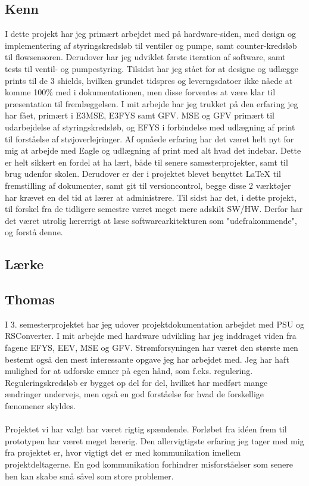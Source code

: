 \subsection{Kenn}
I dette projekt har jeg primært arbejdet med på hardware-siden, med design og implementering af styringskredsløb til ventiler og pumpe, samt counter-kredsløb til flowsensoren. Derudover har jeg udviklet første iteration af software, samt tests til ventil- og pumpestyring. Tilsidst har jeg stået for at designe og udlægge prints til de 3 shields, hvilken grundet tidspres og leverngsdatoer ikke nåede at komme 100\% med i dokumentationen, men disse forventes at være klar til præsentation til fremlæggelsen. I mit arbejde har jeg trukket på den erfaring jeg har fået, primært i E3MSE, E3FYS samt GFV. MSE og GFV primært til udarbejdelse af styringskredsløb, og EFYS i forbindelse med udlægning af print til forståelse af støjoverlejringer.\newline
Af opnåede erfaring har det været helt nyt for mig at arbejde med Eagle og udlægning af print med alt hvad det indebar. Dette er helt sikkert en fordel at ha lært, både til senere samesterprojekter, samt til brug udenfor skolen. Derudover er der i projektet blevet benyttet LaTeX til fremstilling af dokumenter, samt git til versioncontrol, begge disse 2 værktøjer har krævet en del tid at lærer at administrere. Til sidst har det, i dette projekt, til forskel fra de tidligere semestre været meget mere adskilt SW/HW. Derfor har det været utrolig lærerrigt at læse softwarearkitekturen som "udefrakommende", og forstå denne.

\subsection{Lærke}

\subsection{Thomas}
I 3. semesterprojektet har jeg udover projektdokumentation arbejdet med PSU og RSConverter. I mit arbejde med hardware udvikling har jeg inddraget viden fra fagene EFYS, EEV, MSE og GFV. Strømforsyningen har været den største men bestemt også den mest interessante opgave jeg har arbejdet med. Jeg har haft mulighed for at udforske emner på egen hånd, som f.eks. regulering. Reguleringskredsløb er bygget op del for del, hvilket har medført mange ændringer undervejs, men også en god forståelse for hvad de forskellige fænomener skyldes.
\\\\
Projektet vi har valgt har været rigtig spændende. Forløbet fra idéen frem til prototypen har været meget lærerig. Den allervigtigste erfaring jeg tager med mig fra projektet er, hvor vigtigt det er med kommunikation imellem projektdeltagerne. En god kommunikation forhindrer misforståelser som senere hen kan skabe små såvel som store problemer.